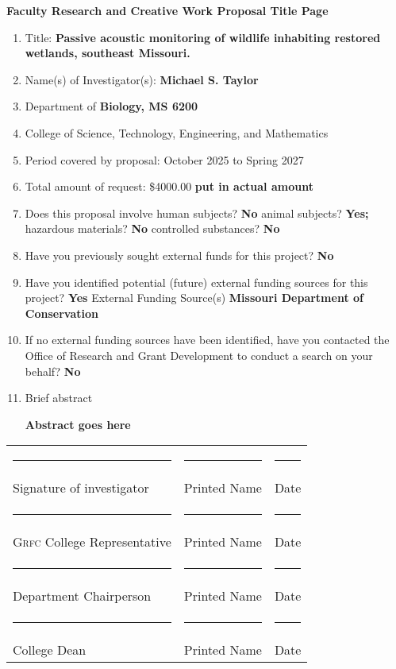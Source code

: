\documentclass[12pt]{article}
\begin{document}
{\Large
	\textbf{Faculty Research and Creative Work Proposal Title Page}
}

\bigskip


\begin{enumerate}
	\item Title: \textbf{Passive acoustic monitoring of wildlife inhabiting  restored wetlands, southeast Missouri.}
	
	\item Name(s) of Investigator(s):  \textbf{Michael S. Taylor}
	
	\item Department of \textbf{Biology, MS 6200}
	
	\item College of Science, Technology, Engineering, and Mathematics
	
	\item Period covered by proposal: October 2025 to Spring 2027
	
	\item Total amount of request: \$4000.00 \textbf{put in actual amount}
	
	\item Does this proposal involve human subjects? \textbf{No} \qquad animal subjects? \textbf{Yes;}\newline
	hazardous materials? \textbf{No} \qquad controlled substances? \textbf{No}
	
	\item Have you previously sought external funds for this project? \qquad \textbf{No}
	
	\item Have you identified potential (future) external funding sources for this project? \textbf{Yes} External
	Funding Source(s) \textbf{Missouri Department of Conservation}
	
	\item If no external funding sources have been identified, have you contacted the Office of Research and
	Grant Development to conduct a search on your behalf?  \textbf{No}
	
	\item Brief abstract
	
	\textbf{Abstract goes here}
	
	


\end{enumerate}

	
\newpage


\noindent\begin{tabular}{@{}lll@{}}
	\rule{3in}{0.4pt} & \noindent\rule{2in}{0.4pt} &
	\rule{1in}{0.4pt} \tabularnewline
	Signature of investigator &
	Printed Name &
	Date \tabularnewline[1cm]
%	
	\rule{3in}{0.4pt} & \noindent\rule{2in}{0.4pt} &
	\rule{1in}{0.4pt} \tabularnewline
	G\textsc{rfc} College Representative &
	Printed Name &
	Date \tabularnewline[1cm]
	\rule{3in}{0.4pt} & \noindent\rule{2in}{0.4pt} &
	\rule{1in}{0.4pt} \tabularnewline
	Department Chairperson &
	Printed Name &
	Date \tabularnewline[1cm]
	\rule{3in}{0.4pt} & \noindent\rule{2in}{0.4pt} &
	\rule{1in}{0.4pt} \tabularnewline
	College Dean &
	Printed Name &
	Date \tabularnewline[1cm]
	
\end{tabular}
\end{document}
